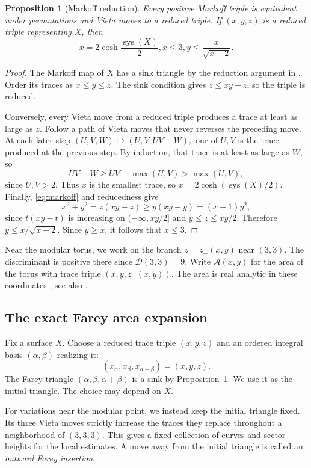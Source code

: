 \documentclass[10pt,twoside]{article}
\theoremstyle{plain}
\newtheorem{proposition}[theorem]{Proposition}
\theoremstyle{definition}
\theoremstyle{remark}
\DeclareMathOperator{\sys}{sys}
\newcommand{\A}{\mathcal A}
\begin{document}
\begin{proposition}[Markoff reduction]
\label{prop:markoff-reduction}
Every positive Markoff triple is equivalent under permutations and
Vieta moves to a reduced triple. If $(x,y,z)$ is a reduced triple
representing $X$, then
$$
x=2\cosh\frac{\sys(X)}2,
x\leq3,
y\leq\frac{x}{\sqrt{x-2}}.
$$
\end{proposition}

\begin{proof}
The Markoff map of $X$ has a sink triangle by the reduction argument
in \cite[Section~3]{Bowditch}. Order its traces as $x\leq y\leq z$.
The sink condition gives $z\leq xy-z$, so the triple is reduced.

Conversely, every Vieta move from a reduced triple produces a
trace at least as large as $z$. Follow a path of Vieta moves that never
reverses the preceding move. At each later step
$
(U,V,W)\longmapsto(U,V,UV-W),
$
one of $U,V$ is the trace produced at the previous step.
By induction, that trace is at least as large as $W$, so
$$
UV-W\geq UV-\max(U,V)>\max(U,V),
$$
since $U,V>2$. Thus $x$ is the smallest trace, so
$x=2\cosh(\sys(X)/2)$. Finally, \eqref{eq:markoff} and reducedness give
$$
x^2+y^2=z(xy-z)\geq y(xy-y)=(x-1)y^2,
$$
since $t(xy-t)$ is increasing on $(-\infty,xy/2]$ and
$
y\leq z\leq xy/2.
$
Therefore
$
y\leq x/\sqrt{x-2}.
$
Since $y\geq x$, it follows that $x\leq3$.
\end{proof}

Near the modular torus, we work on the branch
$z=z_-(x,y)$ near $(3,3)$. The discriminant is positive there since
$\mathscr D(3,3)=9$. Write $\A(x,y)$ for the area of the torus
with trace triple $(x,y,z_-(x,y))$. The area is real analytic in these coordinates
\cite[Section~3, Corollary~1]{McShaneRivinTori}; see also
\cite[slide~30]{Bonahon2018}.

\subsection{The exact Farey area expansion}
\label{sec:farey-area}

Fix a surface $X$. Choose a reduced trace triple $(x,y,z)$ and an
ordered integral basis $(\alpha,\beta)$ realizing it:
$$
(x_\alpha,x_\beta,x_{\alpha+\beta})=(x,y,z).
$$
The Farey triangle $(\alpha,\beta,\alpha+\beta)$ is a sink by
Proposition~\ref{prop:markoff-reduction}. We use it as the initial
triangle. The choice may depend on $X$.

For variations near the modular point, we instead keep the initial
triangle fixed. Its three Vieta moves strictly increase the traces
they replace throughout a neighborhood of $(3,3,3)$. This gives a
fixed collection of curves and sector heights for the local estimates.
A move away from the initial triangle is called an
\emph{outward Farey insertion}.
\end{document}

